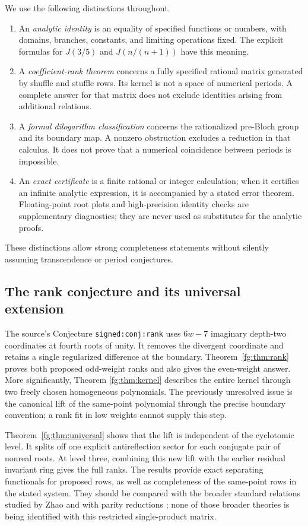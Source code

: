 \documentclass[11pt,a4paper]{article}
\theoremstyle{definition}
\theoremstyle{remark}
\numberwithin{equation}{section}
\begin{document}
We use the following distinctions throughout.
\begin{enumerate}
\item An \emph{analytic identity} is an equality of specified functions
or numbers, with domains, branches, constants, and limiting operations
fixed. The explicit formulas for $J(3/5)$ and $J(n/(n+1))$ have this
meaning.
\item A \emph{coefficient-rank theorem} concerns a fully specified
rational matrix generated by shuffle and stuffle rows. Its kernel is
not a space of numerical periods. A complete answer for that matrix
does not exclude identities arising from additional relations.
\item A \emph{formal dilogarithm classification} concerns the
rationalized pre-Bloch group and its boundary map. A nonzero obstruction
excludes a reduction in that calculus. It does not prove that a
numerical coincidence between periods is impossible.
\item An \emph{exact certificate} is a finite rational or integer
calculation; when it certifies an infinite analytic expression, it is
accompanied by a stated error theorem. Floating-point root
plots and high-precision identity checks are supplementary diagnostics;
they are never used as substitutes for the analytic proofs.
\end{enumerate}
These distinctions allow strong completeness statements without
silently assuming transcendence or period conjectures.

\subsection{The rank conjecture and its universal extension}

The source's Conjecture \texttt{signed:conj:rank} uses $6w-7$ imaginary
depth-two coordinates at fourth roots of unity. It removes the divergent
coordinate and retains a single regularized difference at the boundary.
Theorem~\ref{fg:thm:rank} proves both proposed odd-weight ranks and also
gives the even-weight answer. More significantly, Theorem
\ref{fg:thm:kernel} describes the entire kernel through two freely
chosen homogeneous polynomials. The previously unresolved issue is the
canonical lift of the same-point polynomial through the precise
boundary convention; a rank fit in low weights cannot supply this step.

Theorem~\ref{fg:thm:universal} shows that the lift is independent of the
cyclotomic level. It splits off one explicit antireflection sector for
each conjugate pair of nonreal roots. At level three, combining this
new lift with the earlier residual invariant ring gives the full ranks.
The results provide exact separating functionals for proposed rows,
as well as completeness of the same-point rows in the stated system.
They should be compared with the broader standard relations studied
by Zhao \cite{Zhao2010} and with parity reductions
\cite{Panzer2017,Umezawa2025}; none of those broader theories is being
identified with this restricted single-product matrix.
\end{document}
